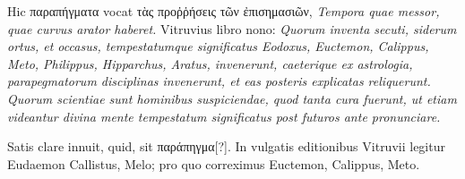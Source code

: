 Hic \textgreek{παραπήγματα} vocat \textgreek{τὰς
προῤῥήσεις τῶν ἐπισημασιῶν}, \textit{Tempora quae
messor, quae curvus arator haberet.}
Vitruvius libro nono: \textit{Quorum inventa
secuti, siderum ortus, et occasus, tempestatumque
significatus Eodoxus,
Euctemon, Calippus, Meto, Philippus,
Hipparchus, Aratus, invenerunt,
caeterique ex astrologia, parapegmatorum
disciplinas invenerunt, et
eas posteris explicatas reliquerunt.}
\textit{Quorum
scientiae sunt hominibus suspiciendae,
quod tanta cura fuerunt, ut etiam videantur divina mente tempestatum
significatus post futuros ante pronunciare.}

Satis clare innuit,
quid, sit \textgreek{παράπηγμα[?]}.
In vulgatis editionibus Vitruvii legitur Eudaemon
Callistus, Melo; pro quo correximus Euctemon, Calippus,
Meto.

